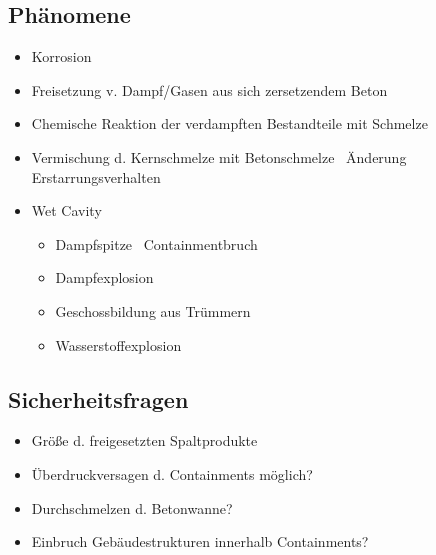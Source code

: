 \documentclass[12pt]{article}
\begin{document}
\subsection{Phänomene}
\begin{itemize}[noitemsep]
	\item Korrosion
	\item Freisetzung v. Dampf/Gasen aus sich zersetzendem Beton
	\item Chemische Reaktion der verdampften Bestandteile mit Schmelze
	\item Vermischung d. Kernschmelze mit Betonschmelze \textrightarrow\ Änderung Erstarrungsverhalten
	\item Wet Cavity
		\begin{itemize}[noitemsep]
			\item Dampfspitze \textrightarrow\ Containmentbruch
			\item Dampfexplosion
			\item Geschossbildung aus Trümmern
			\item Wasserstoffexplosion
		\end{itemize}
\end{itemize}

\subsection{Sicherheitsfragen}
\begin{itemize}[noitemsep]
	\item Größe d. freigesetzten Spaltprodukte
	\item Überdruckversagen d. Containments möglich?
	\item Durchschmelzen d. Betonwanne?
	\item Einbruch Gebäudestrukturen innerhalb Containments?
\end{itemize}
\end{document}
